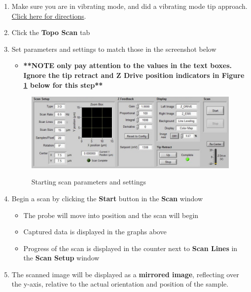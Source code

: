 \documentclass{../lab}
\begin{document}
\begin{enumerate}
    \item Make sure you are in vibrating mode, and did a vibrating mode tip approach. \hyperref[subsec:SettingUpPreScanParametersForVibratingScan]{Click here for directions}.
    
    \item Click the \textbf{Topo Scan} tab
    
    \item Set parameters and settings to match those in the screenshot below
    \begin{itemize}
        \item \textbf{**NOTE only pay attention to the values in the text boxes. Ignore the tip retract and Z Drive position indicators in Figure \ref{fig:TopoScan} below for this step**}
    \end{itemize}
    
    \begin{figure}[H]
        \centering
        \href{http://experimentationlab.berkeley.edu/sites/default/files/AFMImages/toposcansetup.jpg}{\includegraphics[width=0.7\linewidth]{images/toposcansetup.jpg}}
        \caption{Starting scan parameters and settings}
        \label{fig:TopoScan}
    \end{figure}
    
    \item Begin a scan by clicking the \textbf{Start} button in the \textbf{Scan} window
    \begin{itemize}
        \item The probe will move into position and the scan will begin
        
        \item Captured data is displayed in the graphs above
        
        \item Progress of the scan is displayed in the counter next to \textbf{Scan Lines} in the \textbf{Scan Setup} window
    \end{itemize}
    
    \item The scanned image will be displayed as a \textbf{mirrored image}, reflecting over the y-axis, relative to the actual orientation and position of the sample.
    

\end{enumerate}
\end{document}
